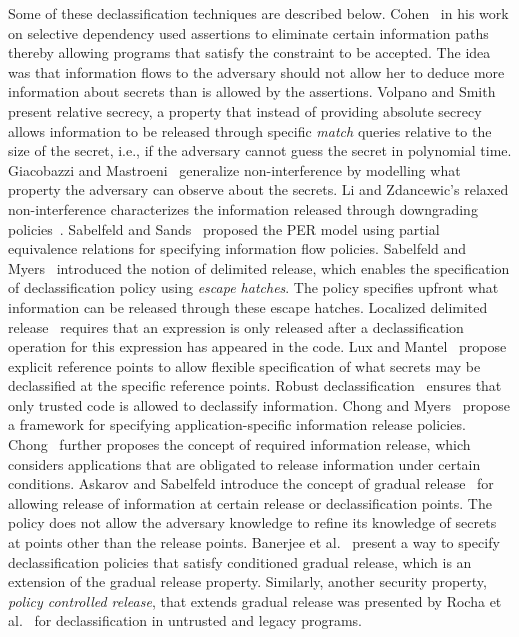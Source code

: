 Some of these declassification techniques are described below.
Cohen~\cite{cohen77,cohen78} in his work on selective
dependency used assertions to eliminate certain information paths
thereby allowing programs that satisfy the constraint to be
accepted. The idea was that information flows to the adversary should
not allow her to deduce more information about secrets than is allowed
by the assertions. Volpano and Smith~\cite{relSec} present relative
secrecy, a property that instead of providing absolute
secrecy allows information to be released through specific
\emph{match} queries relative to the size of the secret, i.e., if the
adversary cannot guess the secret in polynomial time. Giacobazzi and
Mastroeni~\cite{ani} generalize non-interference by modelling what 
property the adversary can observe about the secrets. Li and
Zdancewic's relaxed non-interference characterizes the information
released through downgrading policies~\cite{rel-ni}. Sabelfeld and
Sands~\cite{permodel} proposed the PER model using partial equivalence
relations for specifying information flow policies.
Sabelfeld and Myers~\cite{delRelease} introduced the notion of
delimited release, which enables the specification of declassification
policy using \emph{escape hatches}. The policy specifies upfront what
information can be released through these escape hatches. Localized
delimited release~\cite{ldr} requires that an expression is only released 
after a declassification operation for this expression has appeared
in the code. Lux and Mantel~\cite{Lux} propose explicit reference
points to allow flexible specification of what secrets may be
declassified at the specific reference points. Robust
declassification~\cite{robust} ensures that only trusted code is
allowed to declassify information. Chong and Myers~\cite{chong2004}
propose a framework for specifying application-specific information
release policies. Chong~\cite{rir} further proposes the concept of
required information release, which considers applications that are
obligated to release information under certain conditions. Askarov and 
Sabelfeld introduce the concept of gradual release~\cite{gradRelease}
for allowing release of information at certain release or declassification
points. The policy does not allow the adversary knowledge to refine
its knowledge of secrets at
points other than the release points. Banerjee et al.~\cite{cgrSP}
present a way to specify declassification policies 
that satisfy conditioned gradual release, which is an extension of the
gradual release property. Similarly, another security property,
\emph{policy controlled release}, that extends gradual release was
presented by Rocha et al.~\cite{rochaSP} for declassification in
untrusted and legacy programs.

